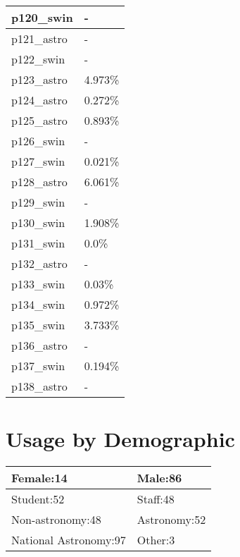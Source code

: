\documentclass{article}%
\begin{document}
\begin{longtabu}{X[l] X[r]}
\hline%
p120\_swin&{-}\\%
\hline%
p121\_astro&{-}\\%
\hline%
p122\_swin&{-}\\%
\hline%
p123\_astro&4.973\%\\%
\hline%
p124\_astro&0.272\%\\%
\hline%
p125\_astro&0.893\%\\%
\hline%
p126\_swin&{-}\\%
\hline%
p127\_swin&0.021\%\\%
\hline%
p128\_astro&6.061\%\\%
\hline%
p129\_swin&{-}\\%
\hline%
p130\_swin&1.908\%\\%
\hline%
p131\_swin&0.0\%\\%
\hline%
p132\_astro&{-}\\%
\hline%
p133\_swin&0.03\%\\%
\hline%
p134\_swin&0.972\%\\%
\hline%
p135\_swin&3.733\%\\%
\hline%
p136\_astro&{-}\\%
\hline%
p137\_swin&0.194\%\\%
\hline%
p138\_astro&{-}\\%
\hline%
\end{longtabu}%
\section{Usage by Demographic}%

%
\begin{longtabu}{X[l] X[l]}%
Female:14&Male:86\\%
\hline%
Student:52&Staff:48\\%
\hline%
Non{-}astronomy:48&Astronomy:52\\%
\hline%
National Astronomy:97&Other:3\\%
\hline%
\end{longtabu}%
\end{document}
